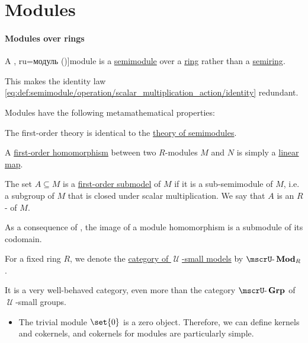 \section{Modules}\label{sec:modules}

\paragraph{Modules over rings}

\begin{definition}\label{def:module}
  A \term[bg=модул (\cite[27]{КоцевСидеров2016КомутативнаАлгебра}, ru=модуль (\cite[def. 9.3.1]{Винберг2014КурсАлгебры})]{module} is a \hyperref[def:semimodule]{semimodule} over a \hyperref[def:ring]{ring} rather than a \hyperref[def:semiring]{semiring}.

  This makes the identity law \eqref{eq:def:semimodule/operation/scalar_multiplication_action/identity} redundant.

  Modules have the following metamathematical properties:
  \begin{thmenum}
    \mimprovised The first-order theory is identical to the \hyperref[def:semimodule/theory]{theory of semimodules}.

     A \hyperref[def:first_order_homomorphism]{first-order homomorphism} between two \( R \)-modules \( M \) and \( N \) is simply a \hyperref[def:linear_function]{linear map}.

     The set \( A \subseteq M \) is a \hyperref[def:first_order_submodel]{first-order submodel} of \( M \) if it is a sub-semimodule of \( M \), i.e. a subgroup of \( M \) that is closed under scalar multiplication. We say that \( A \) is an \( R \)- of \( M \).

    As a consequence of , the image of a module homomorphism is a submodule of its codomain.

    \mimprovised For a fixed ring \( R \), we denote the \hyperref[def:category_of_small_first_order_models]{category of \( \mscrU \)-small models} by \( \ucat{Mod}_R \).

    It is a very well-behaved category, even more than the category \hyperref[def:group/category]{\( \ucat{Grp} \)} of \( \mscrU \)-small groups.
    \begin{itemize}
      \item The trivial module \( \set{ 0 } \) is a zero object. Therefore, we can define kernels and cokernels, and cokernels for modules are particularly simple.


\end{itemize}
\end{thmenum}
\end{definition}
